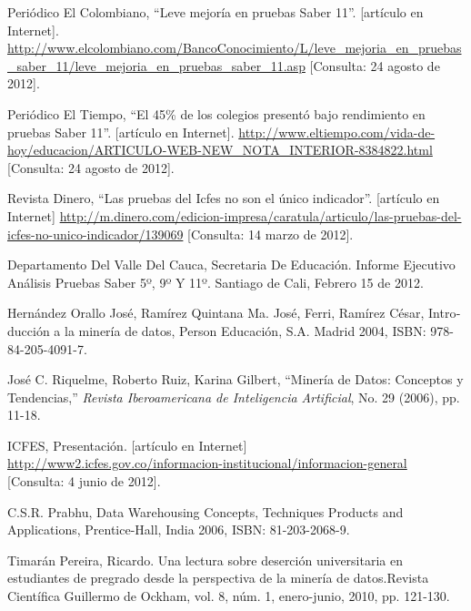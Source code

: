 \begin{thebibliography}{Referencias}
\foreignlanguage{english}{Periódico
El Colombiano, \textquotedblleft{}Leve mejoría en pruebas Saber 11\textquotedblright{}.
{[}artículo en Internet{]}}. \url{http://www.elcolombiano.com/BancoConocimiento/L/leve_mejoria_en_pruebas_saber_11/leve_mejoria_en_pruebas_saber_11.asp}\foreignlanguage{english}{
{[}Consulta: 24 agosto de 2012{]}.}

Periódico El Tiempo, \textquotedblleft{}El 45\% de
los colegios presentó bajo rendimiento en pruebas Saber 11\textquotedblright{}.
{[}artículo en Internet{]}\foreignlanguage{spanish}{. }\url{http://www.eltiempo.com/vida-de-hoy/educacion/ARTICULO-WEB-NEW\_NOTA\_INTERIOR-8384822.html}\foreignlanguage{spanish}{
}{[}Consulta: 24 agosto de 2012{]}.

Revista Dinero, \textquotedblleft{}Las pruebas del
Icfes no son el único indicador\textquotedblright{}. {[}artículo en
Internet{]}   \url{http://m.dinero.com/edicion-impresa/caratula/articulo/las-pruebas-del-icfes-no-unico-indicador/139069}
{[}Consulta: 14 marzo de 2012{]}.

Departamento Del Valle Del Cauca, Secretaria De Educación.
Informe Ejecutivo Análisis Pruebas Saber 5º, 9º Y 11º. Santiago de
Cali, Febrero 15 de 2012.

\foreignlanguage{spanish}{Hernández Orallo José,
Ramírez Quintana Ma. José, Ferri, Ramírez César, Introducción a la
minería de datos, Person Educación, S.A. Madrid 2004, ISBN: 978-84-205-4091-7.}

%
José C. Riquelme, Roberto Ruiz, Karina Gilbert, \textquotedblleft{}Minería
de Datos: Conceptos y Tendencias,\textquotedblright{} \emph{Revista
Iberoamericana de Inteligencia Artificial}, No. 29 (2006), pp. 11-18.

ICFES, Presentación. {[}artículo en Internet{]} \url{http://www2.icfes.gov.co/informacion-institucional/informacion-general}
{[}Consulta: 4 junio de 2012{]}.

C.S.R. Prabhu, Data Warehousing Concepts, Techniques
Products and Applications, Prentice-Hall, India 2006, ISBN: 81-203-2068-9.

Timarán Pereira, Ricardo. Una lectura sobre deserción
universitaria en estudiantes de pregrado desde la perspectiva de la
minería de datos.Revista Científica Guillermo de Ockham, vol. 8, núm.
1, enero-junio, 2010, pp. 121-130.


\end{thebibliography}
